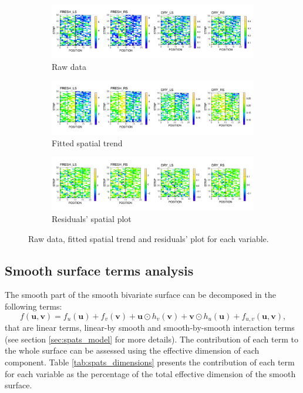 \begin{figure}
	\begin{subfigure}[t]{\textwidth}
		\centering
		\includegraphics[width = \textwidth]{../../Figures/SPATS_rawData_plot.pdf}
		\caption{Raw data}
	\end{subfigure}
	
	\begin{subfigure}[t]{\textwidth}
		\centering
		\includegraphics[width = \textwidth]{../../Figures/SPATS_Fitted_plot.pdf}
		\caption{Fitted spatial trend}
	\end{subfigure}
	
	\begin{subfigure}[t]{\textwidth}
		\centering
		\includegraphics[width = \textwidth]{../../Figures/SPATS_residuals_plot.pdf}
		\caption{Residuals' spatial plot}
	\end{subfigure}
	\caption{Raw data, fitted spatial trend and residuals' plot for each variable.}
	\label{fig:spats_model_results}
\end{figure}

\subsection{Smooth surface terms analysis}
The smooth part of the smooth bivariate surface can be decomposed in the following terms:
\begin{equation}
	f(\boldsymbol{u},\boldsymbol{v}) = f_{u}(\boldsymbol{u})+f_{v}(\boldsymbol{v})+\boldsymbol{u} \odot h_{v}(\boldsymbol{v})+\boldsymbol{v} \odot h_{u}(\boldsymbol{u})+f_{u, v}(\boldsymbol{u}, \boldsymbol{v}) \text{,}
\end{equation}
that are linear terms, linear-by smooth and smooth-by-smooth interaction terms (see section \ref{sec:spats_model} for more details). The contribution of each term to the whole surface can be assessed using the effective dimension of each component. Table \ref{tab:spats_dimensions} presents the contribution of each term for each variable as the percentage of the total effective dimension of the smooth surface.\\


